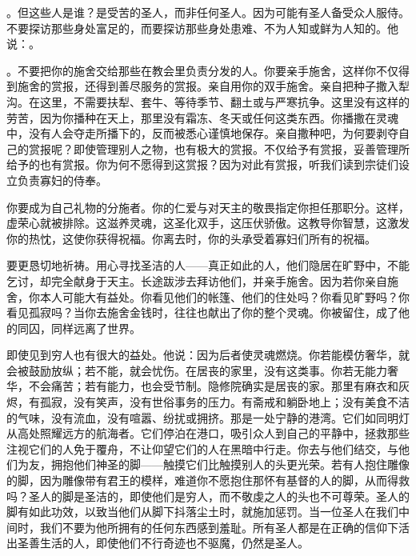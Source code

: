 。但这些人是谁？是受苦的圣人，而非任何圣人。因为可能有圣人备受众人服侍。不要探访那些身处富足的，而要探访那些身处患难、不为人知或鲜为人知的。他说：。\par

。不要把你的施舍交给那些在教会里负责分发的人。你要亲手施舍，这样你不仅得到施舍的赏报，还得到善尽服务的赏报。亲自用你的双手施舍。亲自把种子撒入犁沟。在这里，不需要扶犁、套牛、等待季节、翻土或与严寒抗争。这里没有这样的劳苦，因为你播种在天上，那里没有霜冻、冬天或任何这类东西。你播撒在灵魂中，没有人会夺走所播下的，反而被悉心谨慎地保存。亲自撒种吧，为何要剥夺自己的赏报呢？即使管理别人之物，也有极大的赏报。不仅给予有赏报，妥善管理所给予的也有赏报。你为何不愿得到这赏报？因为对此有赏报，听我们读到宗徒们设立负责寡妇的侍奉。\par

你要成为自己礼物的分施者。你的仁爱与对天主的敬畏指定你担任那职分。这样，虚荣心就被排除。这滋养灵魂，这圣化双手，这压伏骄傲。这教导你智慧，这激发你的热忱，这使你获得祝福。你离去时，你的头承受着寡妇们所有的祝福。\par

要更恳切地祈祷。用心寻找圣洁的人——真正如此的人，他们隐居在旷野中，不能乞讨，却完全献身于天主。长途跋涉去拜访他们，并亲手施舍。因为若你亲自施舍，你本人可能大有益处。你看见他们的帐篷、他们的住处吗？你看见旷野吗？你看见孤寂吗？当你去施舍金钱时，往往也献出了你的整个灵魂。你被留住，成了他的同囚，同样远离了世界。\par

即使见到穷人也有很大的益处。他说：因为后者使灵魂燃烧。你若能模仿奢华，就会被鼓励放纵；若不能，就会忧伤。在居丧的家里，没有这类事。你若无能力奢华，不会痛苦；若有能力，也会受节制。隐修院确实是居丧的家。那里有麻衣和灰烬，有孤寂，没有笑声，没有世俗事务的压力。有斋戒和躺卧地上；没有美食不洁的气味，没有流血，没有喧嚣、纷扰或拥挤。那是一处宁静的港湾。它们如同明灯从高处照耀远方的航海者。它们停泊在港口，吸引众人到自己的平静中，拯救那些注视它们的人免于覆舟，不让仰望它们的人在黑暗中行走。你去与他们结交，与他们为友，拥抱他们神圣的脚——触摸它们比触摸别人的头更光荣。若有人抱住雕像的脚，因为雕像带有君王的模样，难道你不愿抱住那怀有基督的人的脚，从而得救吗？圣人的脚是圣洁的，即使他们是穷人，而不敬虔之人的头也不可尊荣。圣人的脚有如此功效，以致当他们从脚下抖落尘土时，就施加惩罚。当一位圣人在我们中间时，我们不要为他所拥有的任何东西感到羞耻。所有圣人都是在正确的信仰下活出圣善生活的人，即使他们不行奇迹也不驱魔，仍然是圣人。\par

